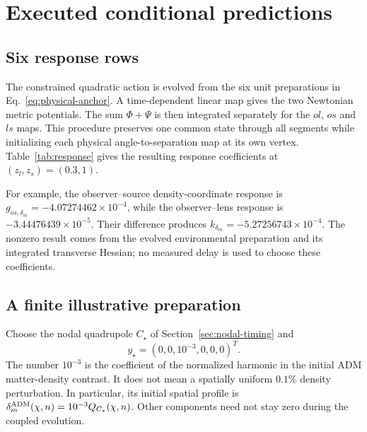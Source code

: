 \documentclass[11pt,a4paper]{article}
\begin{document}


\section{Executed conditional predictions}
\label{sec:numerical-results}

\subsection{Six response rows}

The constrained quadratic action is evolved from the six unit
preparations in Eq.~\eqref{eq:physical-anchor}. A time-dependent linear
map gives the two Newtonian metric potentials. The sum $\Phi+\Psi$ is
then integrated separately for the $ol$, $os$ and $ls$ maps. This
procedure preserves one common state through all segments while
initializing each physical angle-to-separation map at its own vertex.
Table~\ref{tab:response} gives the resulting response coefficients at
$(z_l,z_s)=(0.3,1)$.

\begin{table}[tbp]
\centering\small

\caption{Executed unit-state coefficients at $(z_l,z_s)=(0.3,1)$.
The $g$ rows determine fractional shear through
Eq.~\eqref{eq:shear-response}; $k_j$ determines the nodal SIS fractional
delay at $\varphi=0$. Initial coordinates and $L^2$ spatial normalization
are fixed by Eqs.~\eqref{eq:physical-anchor} and
\eqref{eq:harmonic-normalization}. These columns are response derivatives
in that basis, not independently assigned physical perturbation sizes.}
\label{tab:response}
\end{table}

For example, the observer--source density-coordinate response is
$g_{os,\delta_m}=-4.07274462\times10^{-4}$, while the
observer--lens response is $-3.44476439\times10^{-5}$.
Their difference produces
$k_{\delta_m}=-5.27256743\times10^{-4}$.
The nonzero result comes from the evolved environmental preparation
and its integrated transverse Hessian; no measured delay is used to
choose these coefficients.

\subsection{A finite illustrative preparation}

Choose the nodal quadrupole $C_\star$ of
Section~\ref{sec:nodal-timing} and
\begin{equation}
 y_\star=(0,0,10^{-3},0,0,0)^T.
 \label{eq:illustrative-state}
\end{equation}
The number $10^{-3}$ is the coefficient of the normalized harmonic in
the initial ADM matter-density contrast. It does not mean a spatially
uniform $0.1\%$ density perturbation. In particular, its initial spatial
profile is $\delta_m^{\rm ADM}(\chi,n)=10^{-3}Q_{C_\star}(\chi,n)$.
Other components need not stay zero during the coupled evolution.
\end{document}
